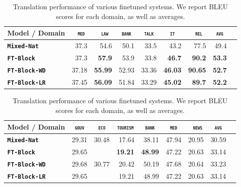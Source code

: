 \documentclass[11pt,a4paper]{article}
\newcommand{\domain}[1]{\texttt{\textsc{#1}}}
\newcommand{\system}[1]{\texttt{\textbf{#1}}}
\newcommand{\SB}[1]{\textbf{#1}}
\begin{document}
\begin{table}
  \centering
  \begin{tabular}{|p{3cm}|*{8}{r|}} \hline
    Model / Domain & \multicolumn{1}{c|}{\domain{ med}} & \multicolumn{1}{c|}{\domain{ law}} & \multicolumn{1}{c|}{\domain{bank}} & \multicolumn{1}{c|}{\domain{talk}} & \multicolumn{1}{c|}{\domain{ it }} & \multicolumn{1}{c|}{\domain{ rel}} & \multicolumn{1}{c|}{\domain{avg}} \\ \hline %
    \system{Mixed-Nat}  & 37.3 & 54.6 & 50.1 & 33.5 & 43.2 & 77.5  & 49.4 \\
   \system{FT-Block}     & 37.3 & \SB{57.9} & 53.9 & 33.8 & \SB{46.7} & \SB{90.2} & \SB{53.3} \\ 
   \system{FT-Block-WD}     & 37.18 & \SB{55.99} & 52.93 & 33.36 & \SB{46.03} & \SB{90.65} & \SB{52.7} \\
   \system{FT-Block-LR}     & 37.45 & \SB{56.09} & 51.84 & 33.29 & \SB{45.02} & \SB{89.7} & \SB{52.2} \\
     \hline
  \end{tabular}
  \caption{Translation performance of various finetuned systems. We report BLEU scores for each domain, as well as averages.}
  \label{tab:performance-en-fr}
\end{table}

\begin{table}
  \centering
  \begin{tabular}{|p{3cm}|*{8}{r|}} \hline
    Model / Domain & \multicolumn{1}{c|}{\domain{gouv}} & \multicolumn{1}{c|}{\domain{eco}} & \multicolumn{1}{c|}{\domain{tourism}} & \multicolumn{1}{c|}{\domain{bank}} & \multicolumn{1}{c|}{\domain{ med }} & \multicolumn{1}{c|}{\domain{ news}} & \multicolumn{1}{c|}{\domain{avg}} \\ \hline %
    \system{Mixed-Nat}  & 29.31 & 30.48 & 17.64 & 38.11 & 47.94 & 20.95  & 30.59 \\
   \system{FT-Block}     & 29.65 &  & \SB{19.21} & \SB{48.99} & 47.22 & 20.63 & 33.14 \\
   \system{FT-Block-WD}     & 29.68 & 30.77 & 20.42 & 50.19 & 47.68 & 20.64 & 33.23 \\
   \system{FT-Block-LR}     & 29.65 &  & 19.21 & 48.99 & 47.22 & 20.63 & 33.14 \\ 
     \hline
  \end{tabular}
  \caption{Translation performance of various finetuned systems. We report BLEU scores for each domain, as well as averages.}
  \label{tab:performance-en-de}
\end{table}
\end{document}
